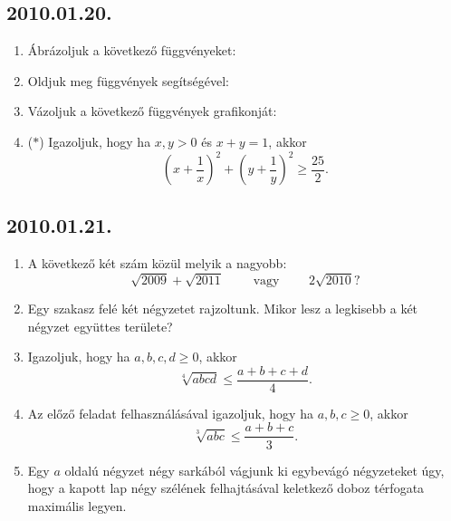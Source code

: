 \subsection*{2010.01.20.}
\begin{enumerate}
\item Ábrázoljuk a következő függvényeket:
\item Oldjuk meg függvények segítségével:
\item Vázoljuk a következő függvények grafikonját:

\item ($*$) Igazoljuk, hogy ha $x,y>0$ és $x+y=1$, akkor
$$\left(x+\dfrac{1}{x}\right)^2+\left(y+\dfrac{1}{y}\right)^2\ge \dfrac{25}{2}.$$ 

\end{enumerate}

\subsection*{2010.01.21.}
\begin{enumerate}
\item A következő két szám közül melyik a nagyobb:
$$\sqrt{2009}+\sqrt{2011}\qquad \text{~vagy~}\qquad 2\sqrt{2010}?$$
\item Egy szakasz felé két négyzetet rajzoltunk. Mikor lesz a legkisebb a két négyzet együttes területe?

\item Igazoljuk, hogy ha $a,b,c,d \ge 0$, akkor
$$\sqrt[4]{abcd}\le\dfrac{a+b+c+d}{4}.$$
\item Az előző feladat felhasználásával igazoljuk, hogy ha $a,b,c \ge 0$, akkor
$$\sqrt[3]{abc}\le\dfrac{a+b+c}{3}.$$
\item Egy $a$ oldalú négyzet négy sarkából vágjunk ki egybevágó négyzeteket úgy,
hogy a kapott lap négy szélének felhajtásával keletkező doboz térfogata maximális legyen.
\end{enumerate}

